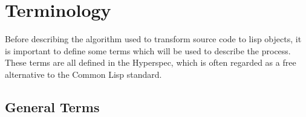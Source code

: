 \documentclass[a4paper,10pt,twoside]{report}
\newcommand{\cl}{Common Lisp}
\begin{document}




\section{Terminology}
\label{subsec:terminology}

Before describing the algorithm used to transform source code to lisp objects,
it is important to define some terms which will be used to describe the
process.  These terms are all defined in the Hyperspec, which is often regarded
as a free alternative to the \cl{} standard.

\subsection{General Terms}
\label{subsubsec:general-terms}
\end{document}
